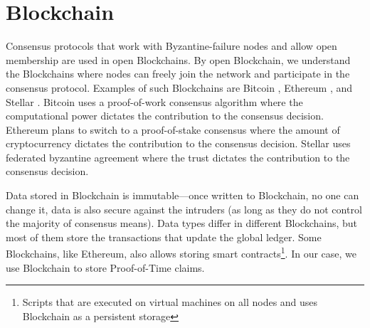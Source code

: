 
\chapter{Blockchain}
\label{blockchain}
Consensus protocols that work with Byzantine-failure nodes and allow open membership are used in open Blockchains. By open Blockchain, we understand the Blockchains where nodes can freely join the network and participate in the consensus protocol. Examples of such Blockchains are Bitcoin \cite{nakamoto2008peer}, Ethereum \cite{wood2014ethereum}, and Stellar \cite{mazieres2015stellar}. Bitcoin uses a proof-of-work consensus algorithm where the computational power dictates the contribution to the consensus decision. Ethereum plans to switch to a proof-of-stake consensus where the amount of cryptocurrency dictates the contribution to the consensus decision. Stellar uses federated byzantine agreement where the trust dictates the contribution to the consensus decision. 

Data stored in Blockchain is immutable––once written to Blockchain, no one can change it, data is also secure against the intruders (as long as they do not control the majority of consensus means). Data types differ in different Blockchains, but most of them store the transactions that update the global ledger. Some Blockchains, like Ethereum, also allows storing smart contracts\footnote{Scripts that are executed on virtual machines on all nodes and uses Blockchain as a persistent storage}. In our case, we use Blockchain to store Proof-of-Time claims. 

